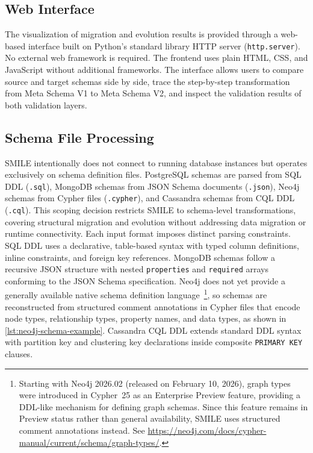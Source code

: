 \subsection{Web Interface}\label{subsec:tech-web}
The visualization of migration and evolution results is provided through a web-based interface built on Python's standard library HTTP server (\texttt{http.server}). No external web framework is required. The frontend uses plain HTML, CSS, and JavaScript without additional frameworks. The interface allows users to compare source
  and target schemas side by side, trace the step-by-step transformation from Meta Schema V1 to Meta Schema V2, and inspect the validation results of both validation
  layers.
\subsection{Schema File Processing}\label{subsec:tech-file-driven}

  SMILE intentionally does not connect to running database instances but operates exclusively on schema definition files. PostgreSQL schemas are
  parsed from SQL DDL (\texttt{.sql}), MongoDB schemas from JSON Schema documents (\texttt{.json}), Neo4j schemas from Cypher files (\texttt{.cypher}), and Cassandra
  schemas from CQL DDL (\texttt{.cql}). This scoping decision restricts SMILE  to schema-level transformations, covering structural migration and evolution without
  addressing data migration or runtime connectivity. Each input format imposes distinct parsing constraints. SQL DDL uses a declarative, table-based syntax with typed
   column definitions, inline constraints, and foreign key references. MongoDB schemas follow a recursive JSON structure with nested \texttt{properties} and
  \texttt{required} arrays conforming to the JSON Schema specification. Neo4j does not yet provide a generally available native schema definition language~\cite{angles2023pg}\footnote{Starting with Neo4j 2026.02 (released on February 10, 2026), graph types
  were introduced in Cypher~25 as an Enterprise Preview feature, providing a DDL-like mechanism for defining graph schemas. Since this feature remains in Preview status rather than general availability, SMILE uses structured comment annotations instead. See \url{https://neo4j.com/docs/cypher-manual/current/schema/graph-types/}.}, so
  schemas are reconstructed from structured comment annotations in Cypher files that encode node types, relationship types, property names, and data types, as shown in \autoref{lst:neo4j-schema-example}.
  Cassandra CQL DDL extends standard DDL syntax with partition key and clustering key declarations inside composite \texttt{PRIMARY KEY} clauses.

